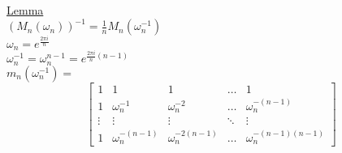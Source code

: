 \documentclass[11pt]{article}
\begin{document}
\begin{enumerate}
    \begin{center}
    \underline{Lemma} \\[10pt]
    $(M_n(\omega_n))^{-1}=\frac{1}{n}M_n(\omega_n^{-1})$ \\[10pt]
    $\omega_n=e^{\frac{2\pi{}i}{n}}$ \\
    $\omega_n^{-1}=\omega_n^{n-1}=e^{\frac{2\pi{}i}{n}(n-1)}$ \\[10pt]
    $m_n(\omega_n^{-1})=$
\[
\begin{bmatrix}
    1 & 1 & 1 & \dots & 1 \\
    1 & \omega_n^{-1} & \omega_n^{-2} & \dots & \omega_n^{-(n-1)} \\
    \vdots & \vdots & \vdots & \ddots & \vdots \\
    1 & \omega_n^{-(n-1)} & \omega_n^{-2(n-1)} & \dots & \omega_n^{-(n-1)(n-1)}
\end{bmatrix}
\]
\end{center}
\end{enumerate}



%
\end{document}
